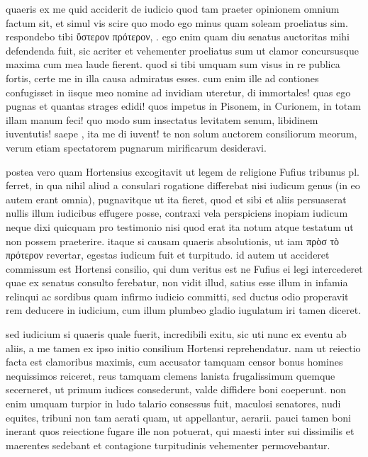 


 quaeris ex me quid acciderit de iudicio quod tam praeter opinionem omnium factum sit, et simul vis scire quo modo ego minus quam soleam proeliatus sim. respondebo tibi ὕστερον πρότερον, . ego enim quam diu senatus auctoritas mihi defendenda fuit, sic acriter et vehementer proeliatus sum ut clamor concursusque maxima cum mea laude fierent. quod si tibi umquam sum visus in re publica fortis, certe me in illa causa admiratus esses. cum enim ille ad contiones confugisset in iisque meo nomine ad invidiam uteretur, di immortales! quas ego pugnas et quantas strages edidi! quos impetus in Pisonem, in Curionem, in totam illam manum feci! quo modo sum insectatus levitatem senum, libidinem iuventutis! saepe , ita me di iuvent! te non solum auctorem consiliorum meorum, verum etiam spectatorem pugnarum mirificarum desideravi.

 postea vero quam Hortensius excogitavit ut legem de religione Fufius tribunus pl. ferret, in qua nihil aliud a consulari rogatione differebat nisi iudicum genus (in eo autem erant omnia), pugnavitque ut ita fieret, quod et sibi et aliis persuaserat nullis illum iudicibus effugere posse, contraxi vela perspiciens inopiam iudicum neque dixi quicquam pro testimonio nisi quod erat ita notum atque testatum ut non possem praeterire. itaque si causam quaeris absolutionis, ut iam πρὸσ τὸ πρότερον revertar, egestas iudicum fuit et turpitudo. id autem ut accideret commissum est Hortensi consilio, qui dum veritus est ne Fufius ei legi intercederet quae ex senatus consulto ferebatur, non vidit illud, satius esse illum in infamia relinqui ac sordibus quam infirmo iudicio committi, sed ductus odio properavit rem deducere in iudicium, cum illum plumbeo gladio iugulatum iri tamen diceret.

 sed iudicium si quaeris quale fuerit, incredibili exitu, sic uti nunc ex eventu ab aliis, a me tamen ex ipso initio consilium Hortensi reprehendatur. nam ut reiectio facta est clamoribus maximis, cum accusator tamquam censor bonus homines nequissimos reiceret, reus tamquam clemens lanista frugalissimum quemque secerneret, ut primum iudices consederunt, valde diffidere boni coeperunt. non enim umquam turpior in ludo talario consessus fuit, maculosi senatores, nudi equites, tribuni non tam aerati quam, ut appellantur, aerarii. pauci tamen boni inerant quos reiectione fugare ille non potuerat, qui maesti inter sui dissimilis et maerentes sedebant et contagione turpitudinis vehementer permovebantur.

